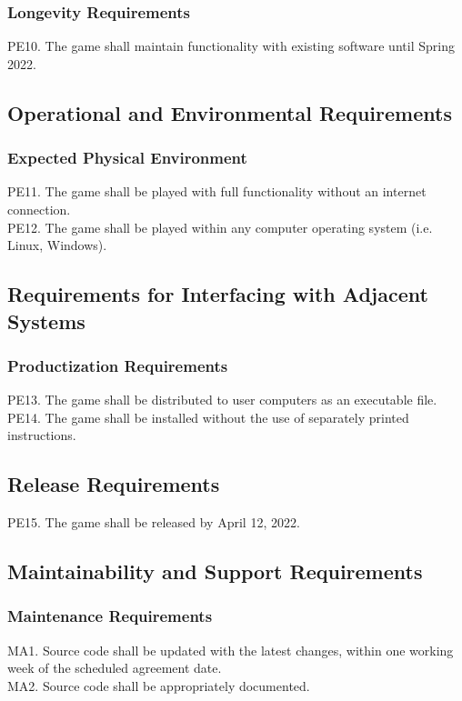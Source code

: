 \documentclass[12pt]{article}
\begin{document}
    \subsubsection{Longevity Requirements}
    PE10. The game shall maintain functionality with existing software until Spring 2022.

\subsection{Operational and Environmental Requirements}
    \subsubsection{Expected Physical Environment}
    PE11. The game shall be played with full functionality without an internet connection.\\
    PE12. The game shall be played within any computer operating system (i.e. Linux, Windows).
    
\subsection{Requirements for Interfacing with Adjacent Systems}
    \subsubsection{Productization Requirements}
    PE13. The game shall be distributed to user computers as an executable file.\\
    PE14. The game shall be installed without the use of separately printed instructions.
    
 \subsection{Release Requirements}
    PE15. The game shall be released by April 12, 2022.
    
 \subsection{Maintainability and Support Requirements}
    \subsubsection{Maintenance Requirements}
    MA1. Source code shall be updated with the latest changes, within one working week of the scheduled agreement date.\\
    MA2. Source code shall be appropriately documented.
    
\end{document}
